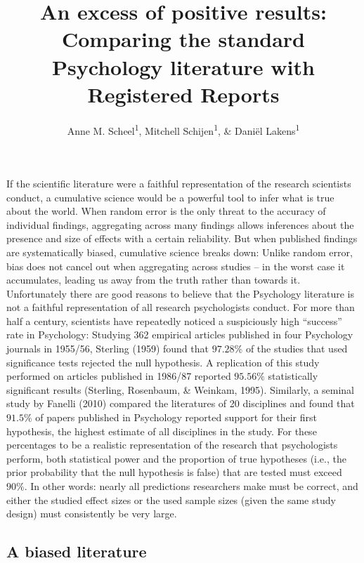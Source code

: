\documentclass[british,,jou,floatsintext]{apa6}
\author{Anne M. Scheel\textsuperscript{1}, Mitchell Schijen\textsuperscript{1}, \& Daniël Lakens\textsuperscript{1}}
\affiliation{
\vspace{0.5cm}
\textsuperscript{1} Eindhoven University of Technology}
\title{An excess of positive results: Comparing the standard Psychology literature with Registered Reports}
\date{}
\begin{document}
\maketitle

If the scientific literature were a faithful representation of the research scientists conduct, a cumulative science would be a powerful tool to infer what is true about the world.
When random error is the only threat to the accuracy of individual findings, aggregating across many findings allows inferences about the presence and size of effects with a certain reliability.
But when published findings are systematically biased, cumulative science breaks down:
Unlike random error, bias does not cancel out when aggregating across studies -- in the worst case it accumulates, leading us away from the truth rather than towards it.
Unfortunately there are good reasons to believe that the Psychology literature is not a faithful representation of all research psychologists conduct.
For more than half a century, scientists have repeatedly noticed a suspiciously high \enquote{success} rate in Psychology:
Studying 362 empirical articles published in four Psychology journals in 1955/56, Sterling (1959) found that \(97.28\%\) of the studies that used significance tests rejected the null hypothesis.
A replication of this study performed on articles published in 1986/87 reported \(95.56\%\) statistically significant results (Sterling, Rosenbaum, \& Weinkam, 1995).
Similarly, a seminal study by Fanelli (2010) compared the literatures of 20 disciplines and found that \(91.5\%\) of papers published in Psychology reported support for their first hypothesis, the highest estimate of all disciplines in the study.
For these percentages to be a realistic representation of the research that psychologists perform, both statistical power and the proportion of true hypotheses (i.e., the prior probability that the null hypothesis is false) that are tested must exceed \(90\%\).
In other words: nearly all predictions researchers make must be correct, and either the studied effect sizes or the used sample sizes (given the same study design) must consistently be very large.

\hypertarget{a-biased-literature}{%
\subsection{A biased literature}\label{a-biased-literature}}
\end{document}
